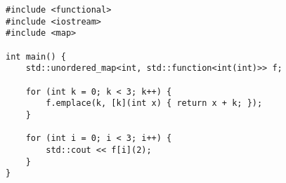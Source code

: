 \begin{lstlisting}[title=\href{https://godbolt.org/z/qHFY32}{\texttt{godbolt.org/z/qHFY32}}]
#include <functional>
#include <iostream>
#include <map>

int main() {
    std::unordered_map<int, std::function<int(int)>> f;
    
    for (int k = 0; k < 3; k++) {
        f.emplace(k, [k](int x) { return x + k; });
    }

    for (int i = 0; i < 3; i++) {
        std::cout << f[i](2);
    }
}
\end{lstlisting}
